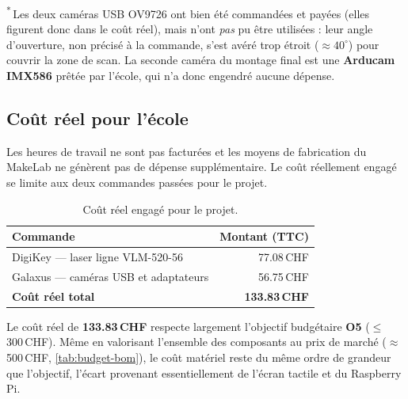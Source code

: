 \textsuperscript{*}\,Les deux caméras USB OV9726 ont bien été commandées et
payées (elles figurent donc dans le coût réel), mais n'ont \emph{pas} pu être
utilisées : leur angle d'ouverture, non précisé à la commande, s'est avéré trop
étroit ($\approx 40^\circ$) pour couvrir la zone de scan. La seconde caméra du
montage final est une \textbf{Arducam IMX586} prêtée par l'école, qui n'a donc
engendré aucune dépense.

\subsection{Coût réel pour l'école}

Les heures de travail ne sont pas facturées et les moyens de fabrication du
MakeLab ne génèrent pas de dépense supplémentaire. Le coût réellement engagé
se limite aux deux commandes passées pour le projet.

\begin{table}[H]
  \centering
  \begin{tabular}{@{}p{8cm}r@{}}
    \toprule
    \textbf{Commande} & \textbf{Montant (TTC)} \\
    \midrule
    DigiKey --- laser ligne VLM-520-56          & 77.08\,CHF \\
    Galaxus --- caméras USB et adaptateurs       & 56.75\,CHF \\
    \midrule
    \textbf{Coût réel total}                     & \textbf{133.83\,CHF} \\
    \bottomrule
  \end{tabular}
  \caption{Coût réel engagé pour le projet.}
  \label{tab:budget-reel}
\end{table}

Le coût réel de \textbf{133.83\,CHF} respecte largement l'objectif
budgétaire \textbf{O5} (\(\leq\) 300\,CHF). Même en valorisant l'ensemble
des composants au prix de marché ($\approx$\,500\,CHF,
\autoref{tab:budget-bom}), le coût matériel reste du même ordre de grandeur
que l'objectif, l'écart provenant essentiellement de l'écran tactile et du
Raspberry Pi.
